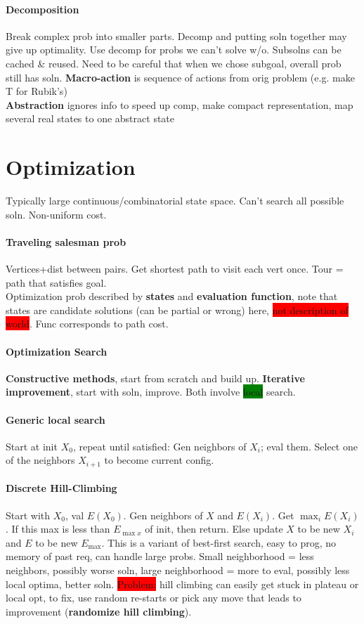 \paragraph{Decomposition} Break complex prob into smaller
parts. Decomp and putting soln together may give up optimality. Use
decomp for probs we can't solve w/o. Subsolns can be cached \&
reused. Need to be careful that when we chose subgoal, overall prob
still has soln. \textbf{Macro-action} is sequence of actions from orig problem
(e.g. make T for Rubik's)
\\ \textbf{Abstraction} ignores info to speed up comp, make compact
representation, map several real states to one abstract state
\color[HTML]{008080}
\section{\textcolor[HTML]{008080}{Optimization}}
Typically large continuous/combinatorial state space. Can't search all
possible soln. Non-uniform cost.
\paragraph{Traveling salesman prob} Vertices+dist between pairs. Get
shortest path to visit each vert once. Tour = path that satisfies
goal.
\\ Optimization prob described by \textbf{states} and
\textbf{evaluation function}, note that states are candidate solutions
(can be partial or wrong)
here, \colorbox{red}{not description of world}. Func corresponds to
path cost.
\paragraph{Optimization Search}
\textbf{Constructive methods}, start from scratch and build
up. \textbf{Iterative improvement}, start with soln, improve. Both
involve \colorbox{green}{local} search.
\paragraph{Generic local search}
Start at init $X_0$, repeat until satisfied: Gen neighbors of $X_i$;
eval them. Select one of the neighbors $X_{i+1}$ to become current
config.
\paragraph{Discrete Hill-Climbing}Start with $X_0$, val $E(X_0)$. Gen
neighbors of $X$ and $E(X_i)$. Get $\max_i E(X_i)$. If this max is
less than $E_{\max x}$ of init, then return. Else update $X$ to be new $X_i$
and $E$ to be new $E_{\max}$. This is a variant of best-first search,
easy to prog, no memory of past req, can handle large probs. Small
neighborhood = less neighbors, possibly worse soln, large
neighborhood = more to eval, possibly less local optima, better
soln. \colorbox{red}{Problem:} hill climbing can easily get stuck in
plateau or local opt, to fix, use random re-starts or pick any move
that leads to improvement (\textbf{randomize hill climbing}).
